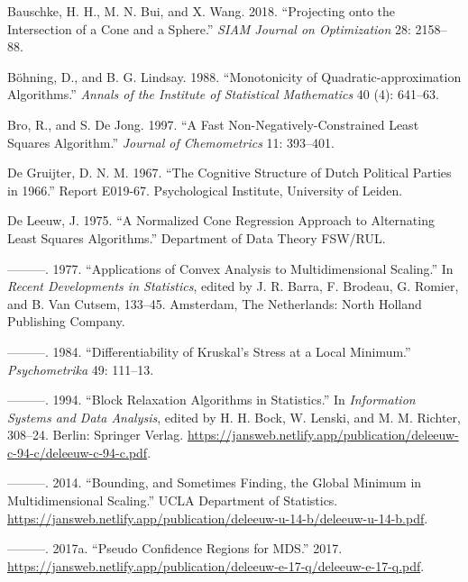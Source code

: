 \documentclass[
  12pt,
]{article}
\newlength{\cslhangindent}
\newenvironment{CSLReferences}[2] %
 {\begin{list}{}{%
  \setlength{\itemindent}{0pt}
  \setlength{\leftmargin}{0pt}
  \setlength{\parsep}{0pt}
  \ifodd #1
   \setlength{\leftmargin}{\cslhangindent}
   \setlength{\itemindent}{-1\cslhangindent}
  \fi
  \setlength{\itemsep}{#2\baselineskip}}}
 {\end{list}}
\begin{document}
\label{refs}
\begin{CSLReferences}{1}{0}
Bauschke, H. H., M. N. Bui, and X. Wang. 2018. {``{Projecting onto the Intersection of a Cone and a Sphere}.''} \emph{SIAM Journal on Optimization} 28: 2158--88.

Böhning, D., and B. G. Lindsay. 1988. {``{Monotonicity of Quadratic-approximation Algorithms}.''} \emph{Annals of the Institute of Statistical Mathematics} 40 (4): 641--63.

Bro, R., and S. De Jong. 1997. {``A Fast Non-Negatively-Constrained Least Squares Algorithm.''} \emph{Journal of Chemometrics} 11: 393--401.

De Gruijter, D. N. M. 1967. {``{The Cognitive Structure of Dutch Political Parties in 1966}.''} Report E019-67. Psychological Institute, University of Leiden.

De Leeuw, J. 1975. {``{A Normalized Cone Regression Approach to Alternating Least Squares Algorithms}.''} Department of Data Theory FSW/RUL.

---------. 1977. {``Applications of Convex Analysis to Multidimensional Scaling.''} In \emph{Recent Developments in Statistics}, edited by J. R. Barra, F. Brodeau, G. Romier, and B. Van Cutsem, 133--45. Amsterdam, The Netherlands: North Holland Publishing Company.

---------. 1984. {``{Differentiability of Kruskal's Stress at a Local Minimum}.''} \emph{Psychometrika} 49: 111--13.

---------. 1994. {``{Block Relaxation Algorithms in Statistics}.''} In \emph{Information Systems and Data Analysis}, edited by H. H. Bock, W. Lenski, and M. M. Richter, 308--24. Berlin: Springer Verlag. \url{https://jansweb.netlify.app/publication/deleeuw-c-94-c/deleeuw-c-94-c.pdf}.

---------. 2014. {``{Bounding, and Sometimes Finding, the Global Minimum in Multidimensional Scaling}.''} UCLA Department of Statistics. \url{https://jansweb.netlify.app/publication/deleeuw-u-14-b/deleeuw-u-14-b.pdf}.

---------. 2017a. {``{Pseudo Confidence Regions for MDS}.''} 2017. \url{https://jansweb.netlify.app/publication/deleeuw-e-17-q/deleeuw-e-17-q.pdf}.


\end{CSLReferences}
\end{document}
